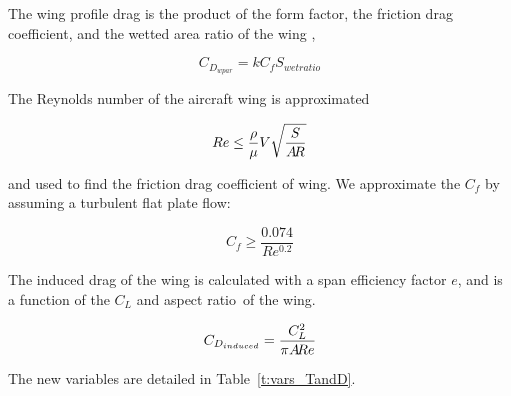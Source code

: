 The wing profile drag is the product of the form factor, the friction drag coefficient,
and the wetted area ratio of the wing \cite{gp_ac_design},

\begin{equation}
    C_{D_{wpar}} = k C_f S_{wetratio}
\label{e:cdwpar}
\end{equation}

The Reynolds number of the aircraft wing is approximated

\begin{equation}
    Re \leq \frac{\rho}{\mu} V \sqrt{\frac{S}{A\!R}}
\label{e:re}
\end{equation}

and used to find the friction drag coefficient of wing. We approximate the $C_f$ by assuming a
turbulent flat plate flow:

\begin{equation}
    C_f \geq \frac{0.074} {Re^{0.2}}
\end{equation}

The induced drag of the wing is calculated with a span efficiency factor $e$, and is a
function of the $C_L$ and aspect ratio~\AR of the wing.

\begin{equation}
    C_{D_{induced}} = \frac{C_L^2}{\pi A\!R e}
\label{e:cdinduced}
\end{equation}

The new variables are detailed in Table~\ref{t:vars_TandD}.

